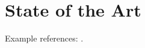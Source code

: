 \section{State of the Art}
\label{sec:State of the Art}

Example references: \citep{Raibert1986LeggedRobotsThatBalance, Vukobratovic2004ZeroMomentPoint, Pratt1995SEA}.